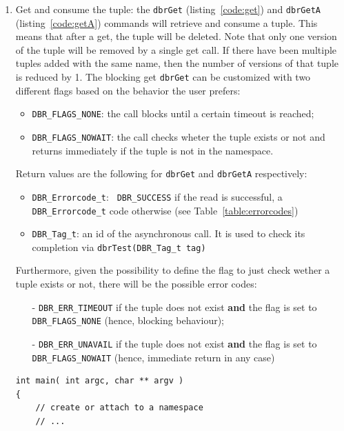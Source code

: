\begin{enumerate}
\item Get and consume the tuple: the \texttt{dbrGet} (listing~\ref{code:get}) and \texttt{dbrGetA} (listing~\ref{code:getA}) commands will retrieve and consume a tuple. This means that after a
  get, the tuple will be deleted. Note that only one version of the
  tuple will be removed by a single get call. If there have been
  multiple tuples added with the same name, then the number of
  versions of that tuple is reduced by 1.
The blocking get \texttt{dbrGet} can be customized with two different flags based on the behavior the user prefers:
\begin{itemize}
	\item \texttt{DBR\_FLAGS\_NONE}: the call blocks until a certain timeout is reached;
	\item \texttt{DBR\_FLAGS\_NOWAIT}: the call checks wheter the tuple exists or not and returns immediately if the tuple is not in the namespace.
\end{itemize}

Return values are the following  for \texttt{dbrGet} and \texttt{dbrGetA} respectively:
\begin{itemize}
	\item \texttt{DBR\_Errorcode\_t}: \texttt{ DBR\_SUCCESS} if the read is successful, a \texttt{DBR\_Errorcode\_t} code otherwise (see Table~\ref{table:errorcodes}) 
	\item \texttt{DBR\_Tag\_t}: an id of the asynchronous call. It is used to check its completion via \texttt{dbrTest(DBR\_Tag\_t tag)}
\end{itemize}

Furthermore, given the possibility to define the flag to just check wether a tuple exists or not, there will be the possible error codes:
\begin{itemize}
	\item[-] \texttt{DBR\_ERR\_TIMEOUT} if the tuple does not exist \textbf{and} the flag is set to \texttt{DBR\_FLAGS\_NONE} (hence, blocking behaviour);
	\item [-] \texttt{DBR\_ERR\_UNAVAIL} if the tuple does not exist \textbf{and} the flag is set to \texttt{DBR\_FLAGS\_NOWAIT} (hence, immediate return in any case)
\end{itemize}


\begin{lstlisting}[style=mystyle,basicstyle=\scriptsize\ttfamily,caption=Get data from the namespace (blocking), label=code:get]
int main( int argc, char ** argv )
{
	// create or attach to a namespace
	// ...


\end{lstlisting}
\end{enumerate}
